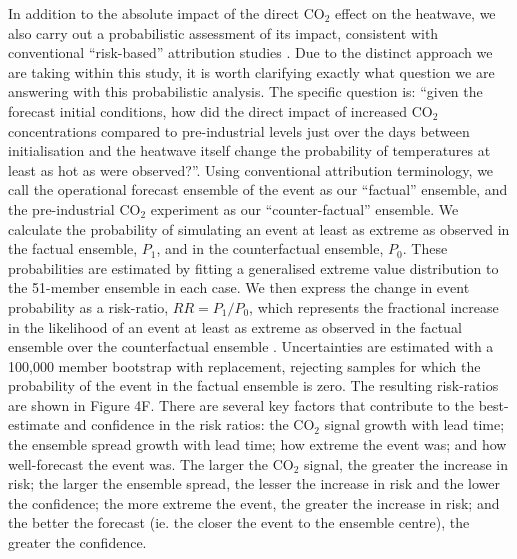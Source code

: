   In addition to the absolute impact of the direct CO$_2$ effect on the heatwave, we also carry out a probabilistic assessment of its impact, consistent with conventional ``risk-based'' attribution studies \citep{shepherd_common_2016,winsberg_severe_2020}. Due to the distinct approach we are taking within this study, it is worth clarifying exactly what question we are answering with this probabilistic analysis. The specific question is: ``given the forecast initial conditions, how did the direct impact of increased CO$_2$ concentrations compared to pre-industrial levels just over the days between initialisation and the heatwave itself change the probability of temperatures at least as hot as were observed?''. Using conventional attribution terminology, we call the operational forecast ensemble of the event as our ``factual'' ensemble, and the pre-industrial CO$_2$ experiment as our ``counter-factual'' ensemble. We calculate the probability of simulating an event at least as extreme as observed in the factual ensemble, $P_1$, and in the counterfactual ensemble, $P_0$. These probabilities are estimated by fitting a generalised extreme value distribution to the 51-member ensemble in each case. We then express the change in event probability as a risk-ratio, $RR=P_1/P_0$, which represents the fractional increase in the likelihood of an event at least as extreme as observed in the factual ensemble over the counterfactual ensemble \citep{stott_human_2004,stone_end--end_2005}. Uncertainties are estimated with a 100,000 member bootstrap with replacement, rejecting samples for which the probability of the event in the factual ensemble is zero. The resulting risk-ratios are shown in Figure 4F. There are several key factors that contribute to the best-estimate and confidence in the risk ratios: the CO$_2$ signal growth with lead time; the ensemble spread growth with lead time; how extreme the event was; and how well-forecast the event was. The larger the CO$_2$ signal, the greater the increase in risk; the larger the ensemble spread, the lesser the increase in risk and the lower the confidence; the more extreme the event, the greater the increase in risk; and the better the forecast (ie. the closer the event to the ensemble centre), the greater the confidence. 
  
